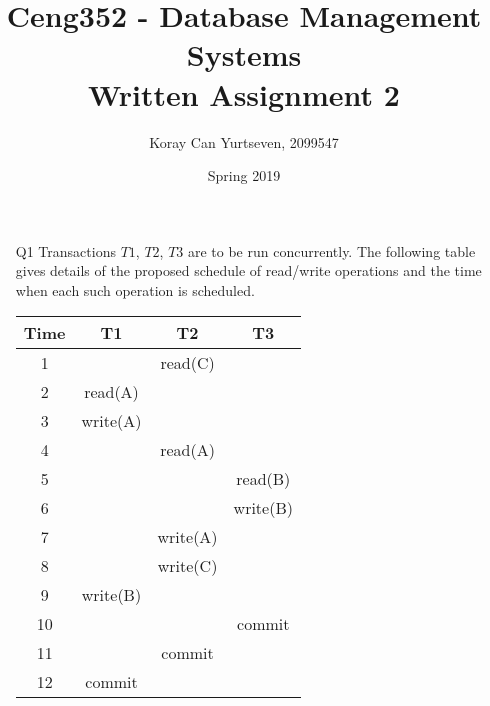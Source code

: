 \documentclass{article}
\title{Ceng352 - Database Management Systems\\Written Assignment 2}
\author{Koray Can Yurtseven, 2099547}
\date{Spring 2019}
\begin{document}
\maketitle

\begin{enumerate}

    \item [Q1] Transactions $ T1 $, $ T2 $, $ T3 $ are to be run concurrently. The following table gives details of the proposed schedule of read/write operations and the time when each such operation is scheduled.
    
    \begin{center}
        \begin{tabular}{| c |c |c |c |}
            \hline
            Time    &   T1          &   T2          &   T3          \\
            \hline \hline
            1       &               &   read(C)     &               \\ 
            \hline
            2       &   read(A)     &               &               \\
            \hline
            3       &   write(A)    &               &               \\
            \hline
            4       &               &   read(A)     &               \\
            \hline
            5       &               &               &   read(B)     \\
            \hline
            6       &               &               &   write(B)    \\
            \hline
            7       &               &   write(A)    &               \\
            \hline
            8       &               &   write(C)    &               \\
            \hline
            9       &   write(B)    &               &               \\
            \hline
            10      &               &               &   commit      \\
            \hline
            11      &               &   commit      &               \\
            \hline
            12      &   commit      &               &               \\ 
            \hline
        \end{tabular}
    \end{center}
    

\end{enumerate}
\end{document}
